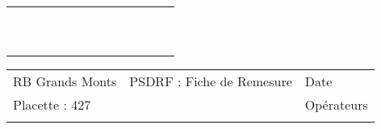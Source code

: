 \documentclass[a4paper, landscape]{article}\usepackage[]{graphicx}\usepackage[]{color}
\begin{document}
{\begin{tabular}{|p{1cm}|p{2cm}|p{1.6cm}|p{1.6cm}|p{1.6cm}|p{1.6cm}|p{1.5cm}|p{1.5cm}|p{1.5cm}|p{1.5cm}|p{1.5cm}|p{7.5cm}|p{5cm}|}
   \rowcolor[gray]{0.95} \hline
 &  &  &  &  &  &  &  &  &  &  &  &  \\ 
   \hline
 &  &  &  &  &  &  &  &  &  &  &  &  \\ 
   \rowcolor[gray]{0.95} \hline
 &  &  &  &  &  &  &  &  &  &  &  &  \\ 
   \hline
 &  &  &  &  &  &  &  &  &  &  &  &  \\ 
   \rowcolor[gray]{0.95} \hline
 &  &  &  &  &  &  &  &  &  &  &  &  \\ 
   \hline
 &  &  &  &  &  &  &  &  &  &  &  &  \\ 
   \rowcolor[gray]{0.95} \hline
 &  &  &  &  &  &  &  &  &  &  &  &  \\ 
   \hline
 &  &  &  &  &  &  &  &  &  &  &  &  \\ 
   \rowcolor[gray]{0.95} \hline
 &  &  &  &  &  &  &  &  &  &  &  &  \\ 
   \hline
 &  &  &  &  &  &  &  &  &  &  &  &  \\ 
   \rowcolor[gray]{0.95} \hline
 &  &  &  &  &  &  &  &  &  &  &  &  \\ 
   \hline
\end{tabular}
}

\begin{tabular}{p{10cm}p{10cm}p{8cm}}
  RB Grands Monts & PSDRF : Fiche de Remesure & Date \\ 
  Placette : 427 &  & Opérateurs \\ 
   &  &  \\ 
  \end{tabular}
\end{document}
